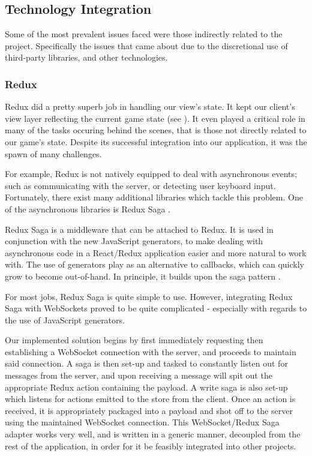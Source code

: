 \documentclass{standalone}
\begin{document}
		\subsection{Technology Integration}
			Some of the most prevalent issues faced were those indirectly related to the project. Specifically the issues that came about due to the discretional use of third-party libraries, and other technologies.

			\subsubsection{Redux} \label{sec:reduxIntegration}
				Redux did a pretty superb job in handling our view's state. It kept our client's view layer reflecting the current game state (see ). It even played a critical role in many of the tasks occuring behind the scenes, that is those not directly related to our game's state. Despite its successful integration into our application, it was the spawn of many challenges.

				For example, Redux is not natively equipped to deal with asynchronous events; such as communicating with the server, or detecting user keyboard input. Fortunately, there exist many additional libraries which tackle this problem. One of the asynchronous libraries is Redux Saga \parencite{reduxSaga}.

				Redux Saga is a middleware that can be attached to Redux. It is used in conjunction with the new JavaScript generators, to make dealing with asynchronous code in a React/Redux application easier and more natural to work with. The use of generators play as an alternative to callbacks, which can quickly grow to become out-of-hand. In principle, it builds upon the saga pattern \parencite{sagas}.

				For most jobs, Redux Saga is quite simple to use. However, integrating Redux Saga with WebSockets proved to be quite complicated - especially with regards to the use of JavaScript generators.

				Our implemented solution begins by first immediately requesting then establishing a WebSocket connection with the server, and proceeds to maintain said connection. A saga is then set-up and tasked to constantly listen out for messages from the server, and upon receiving a message will spit out the appropriate Redux action containing the payload. A write saga is also set-up which listens for actions emitted to the store from the client. Once an action is received, it is appropriately packaged into a payload and shot off to the server using the maintained WebSocket connection. This WebSocket/Redux Saga adapter works very well, and is written in a generic manner, decoupled from the rest of the application, in order for it be feasibly integrated into other projects.
\end{document}
